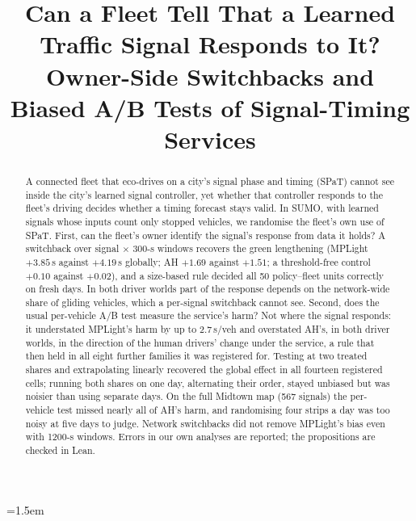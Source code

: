 
\usepackage{multirow}
\emergencystretch=1.5em



\title{Can a Fleet Tell That a Learned Traffic Signal Responds to It?\\
Owner-Side Switchbacks and Biased A/B Tests of Signal-Timing Services}

\author{
}

\maketitle

\begin{abstract}
A connected fleet that eco-drives on a city's signal phase and timing (SPaT) cannot see inside the city's learned signal controller,
yet whether that controller responds to the fleet's driving decides whether a timing forecast stays valid. In SUMO, with learned
signals whose inputs count only stopped vehicles, we randomise the fleet's own use of SPaT. First, can the fleet's owner identify the
signal's response from data it holds? A switchback over signal $\times$ 300-s windows recovers the green lengthening (MPLight $+3.85$\,s
against $+4.19$\,s globally; AH $+1.69$ against $+1.51$; a threshold-free control $+0.10$ against $+0.02$), and a size-based rule decided
all 50 policy--fleet units correctly on fresh days. In both driver worlds part of the response depends on the network-wide share of
gliding vehicles, which a per-signal switchback cannot see. Second, does the usual per-vehicle A/B test measure the service's harm? Not
where the signal responds: it understated MPLight's harm by up to 2.7\,s/veh and overstated AH's, in both driver worlds, in the
direction of the human drivers' change under the service, a rule that then held in all eight further families it was registered for.
Testing at two treated shares and extrapolating linearly recovered the global effect in all fourteen registered cells; running both
shares on one day, alternating their order, stayed unbiased but was noisier than using separate days. On the full Midtown map (567
signals) the per-vehicle test missed nearly all of AH's harm, and randomising four strips a day was too noisy at five days to judge.
Network switchbacks did not remove MPLight's bias even with 1200-s windows. Errors in our own analyses are reported; the propositions
are checked in Lean.
\end{abstract}

